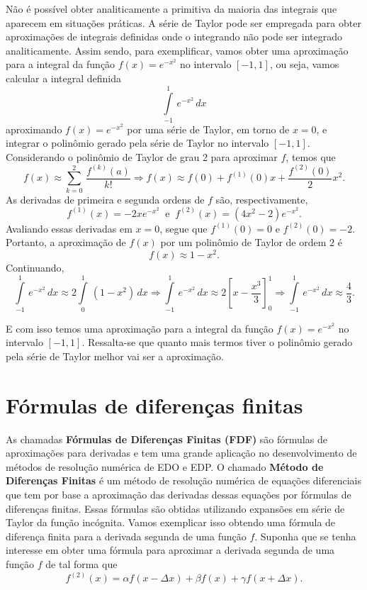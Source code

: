 \documentclass[10pt]{article}
\begin{document}
Não é possível obter analiticamente a primitiva da maioria das integrais que 
aparecem em situações práticas. A série de Taylor pode ser empregada para 
obter aproximações de integrais definidas onde o integrando não pode ser 
integrado analiticamente. Assim sendo, para exemplificar, vamos obter uma 
aproximação para a integral da função $f(x)=e^{-x^2}$ no intervalo 
$[-1,1]$, ou seja, vamos calcular a integral definida
\begin{equation}
\int\limits_{-1}^{1}\,e^{-x^2}\,dx
\label{integral}
\end{equation}   
aproximando $f(x)=e^{-x^2}$ por uma série de Taylor, em torno de $x=0$, 
e integrar o polinômio gerado pela série de Taylor no intervalo $[-1,1]$. 
Considerando o polinômio de Taylor de grau 2 para aproximar 
$f$, temos que
\begin{equation*}
f(x)\approx \sum\limits_{k=0}^{2}\,\dfrac{f^{(k)}(a)}{k!}
\Rightarrow
f(x)\approx f(0)+f^{(1)}(0)x+\dfrac{f^{(2)}(0)}{2}x^2.
\end{equation*}
As derivadas de primeira e segunda ordens de $f$ são, respectivamente,
\[ 
f^{(1)}(x)=-2xe^{-x^2}\;\;\text{e}\;\;f^{(2)}(x)=(4x^2-2)e^{-x^2}.
\] 
Avaliando essas derivadas em $x=0$, segue que $f^{(1)}(0)=0$ e 
$f^{(2)}(0)=-2$. Portanto, a aproximação de $f(x)$ por um polinômio de 
Taylor de ordem $2$ é 
\begin{equation*}
f(x)\approx 1-x^2.
\end{equation*}
Continuando,
\begin{equation*}
\int\limits_{-1}^{1}\,e^{-x^2}\,dx\approx 
2\int\limits_{0}^{1}\,(1-x^2)\,dx
\Rightarrow
\int\limits_{-1}^{1}\,e^{-x^2}\,dx\approx 2\left[x-\dfrac{x^3}{3}\right]
_{0}^{1}\Rightarrow \int\limits_{-1}^{1}\,e^{-x^2}\,dx\approx \dfrac{4}{3}. 
\end{equation*}

E com isso temos uma aproximação para a integral da função $f(x)=e^{-x^2}$ 
no intervalo $[-1,1]$. Ressalta-se que quanto mais termos tiver o polinômio 
gerado pela série de Taylor melhor vai ser a aproximação. 

\section{Fórmulas de diferenças finitas}

As chamadas \textbf{Fórmulas de Diferenças Finitas (FDF)} são fórmulas de 
aproximações para derivadas e tem uma grande aplicação no desenvolvimento 
de métodos de resolução numérica de EDO e EDP. 
O chamado \textbf{Método de Diferenças Finitas} 
é um método de resolução numérica de equações diferenciais que tem por 
base a aproximação das derivadas dessas equações por fórmulas de diferenças finitas. 
Essas fórmulas são obtidas utilizando expansões em série de Taylor da função 
incógnita. Vamos exemplicar isso obtendo uma fórmula de diferença finita 
para a derivada segunda de uma função $f$. Suponha que se tenha interesse em obter uma 
fórmula para aproximar a derivada segunda de uma função $f$ de tal forma que
\begin{equation}
f^{(2)}(x)=\alpha f(x-\Delta x)+\beta f(x)+\gamma f(x+\Delta x).
\label{fdf1}
\end{equation}
\end{document}
